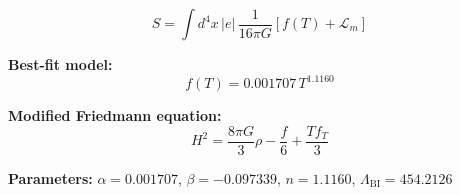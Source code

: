 
\begin{equation}
  S = \int d^4x \, |e| \, \frac{1}{16\pi G} \left[ f(T) + \mathcal{L}_m \right]
\end{equation}

\textbf{Best-fit model:}
\begin{equation}
  f(T) = 0.001707 \, T^{1.1160}
\end{equation}

\textbf{Modified Friedmann equation:}
\begin{equation}
  H^2 = \frac{8\pi G}{3} \rho - \frac{f}{6} + \frac{T f_T}{3}
\end{equation}

\textbf{Parameters:}
$\alpha = 0.001707$, \quad
$\beta = -0.097339$, \quad
$n = 1.1160$, \quad
$\Lambda_{\text{BI}} = 454.2126$